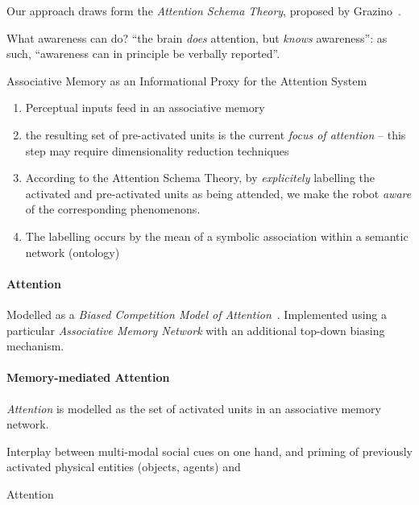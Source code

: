 \documentclass[a4paper]{article}
\begin{document}
Our approach draws form the \emph{Attention Schema Theory}, proposed by
Grazino~\cite{graziano2013consciousness}.

What awareness can do? ``the brain \emph{does} attention, but \emph{knows}
awareness'': as such, ``awareness can in principle be verbally reported''.



Associative Memory as an Informational Proxy for the Attention System


\begin{enumerate}
    \item Perceptual inputs feed in an associative memory

    \item the resulting set of pre-activated units is the current
        \emph{focus of attention} -- this step may require dimensionality
        reduction techniques

    \item According to the Attention Schema Theory, by \emph{explicitely}
        labelling the activated and pre-activated units as being attended, we
        make the robot \emph{aware} of the corresponding phenomenons.

    \item The labelling occurs by the mean of a symbolic association within a
        semantic network (ontology)

\end{enumerate}

\paragraph{Attention}

Modelled as a \emph{Biased Competition Model of
Attention}~\cite{desimone1995neural}.
Implemented using a particular \emph{Associative Memory Network} with an
additional top-down biasing mechanism.

\paragraph{Memory-mediated Attention}

\emph{Attention} is modelled as the set of activated units in an associative
memory network.


Interplay between multi-modal social cues on one hand, and priming of previously activated physical
entities (objects, agents) and 

Attention
\end{document}

